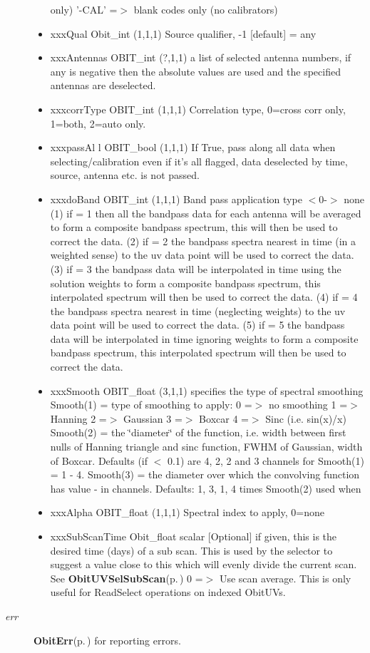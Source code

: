 \begin{Desc}
\begin{description}
\begin{itemize}
only) '-CAL' =$>$ blank codes only (no calibrators) \item xxx\-Qual Obit\_\-int (1,1,1) Source qualifier, -1 [default] = any \item xxx\-Antennas OBIT\_\-int (?,1,1) a list of selected antenna numbers, if any is negative then the absolute values are used and the specified antennas are deselected. \item xxxcorr\-Type OBIT\_\-int (1,1,1) Correlation type, 0=cross corr only, 1=both, 2=auto only. \item xxxpass\-Al l OBIT\_\-bool (1,1,1) If True, pass along all data when selecting/calibration even if it's all flagged, data deselected by time, source, antenna etc. is not passed. \item xxxdo\-Band OBIT\_\-int (1,1,1) Band pass application type $<$0-$>$ none (1) if = 1 then all the bandpass data for each antenna will be averaged to form a composite bandpass spectrum, this will then be used to correct the data. (2) if = 2 the bandpass spectra nearest in time (in a weighted sense) to the uv data point will be used to correct the data. (3) if = 3 the bandpass data will be interpolated in time using the solution weights to form a composite bandpass spectrum, this interpolated spectrum will then be used to correct the data. (4) if = 4 the bandpass spectra nearest in time (neglecting weights) to the uv data point will be used to correct the data. (5) if = 5 the bandpass data will be interpolated in time ignoring weights to form a composite bandpass spectrum, this interpolated spectrum will then be used to correct the data. \item xxx\-Smooth OBIT\_\-float (3,1,1) specifies the type of spectral smoothing Smooth(1) = type of smoothing to apply: 0 =$>$ no smoothing 1 =$>$ Hanning 2 =$>$ Gaussian 3 =$>$ Boxcar 4 =$>$ Sinc (i.e. sin(x)/x) Smooth(2) = the \char`\"{}diameter\char`\"{} of the function, i.e. width between first nulls of Hanning triangle and sinc function, FWHM of Gaussian, width of Boxcar. Defaults (if $<$ 0.1) are 4, 2, 2 and 3 channels for Smooth(1) = 1 - 4. Smooth(3) = the diameter over which the convolving function has value - in channels. Defaults: 1, 3, 1, 4 times Smooth(2) used when \item xxx\-Alpha OBIT\_\-float (1,1,1) Spectral index to apply, 0=none \item xxx\-Sub\-Scan\-Time Obit\_\-float scalar [Optional] if given, this is the desired time (days) of a sub scan. This is used by the selector to suggest a value close to this which will evenly divide the current scan. See {\bf Obit\-UVSel\-Sub\-Scan}{\rm (p.\,\pageref{ObitUVSel_8c_a21})} 0 =$>$ Use scan average. This is only useful for Read\-Select operations on indexed Obit\-UVs. \end{itemize}
\item[{\em err}]{\bf Obit\-Err}{\rm (p.\,\pageref{structObitErr})} for reporting errors. \end{description}
\end{Desc}
